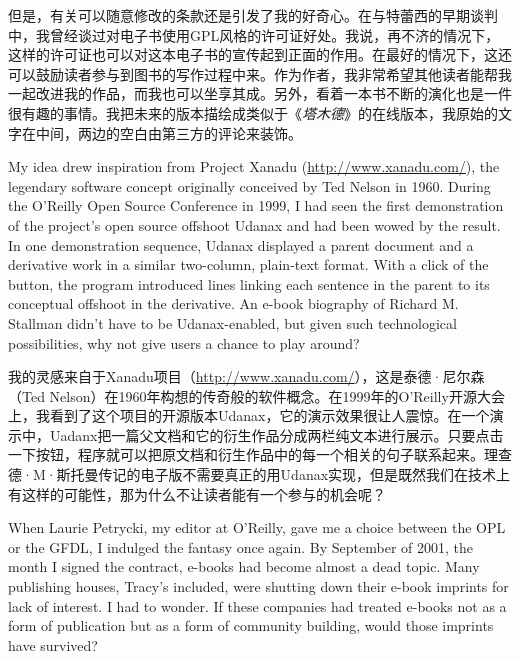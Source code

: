 \ifdefined\chs
但是，有关可以随意修改的条款还是引发了我的好奇心。在与特蕾西的早期谈判中，我曾经谈过对电子书使用GPL风格的许可证好处。我说，再不济的情况下，这样的许可证也可以对这本电子书的宣传起到正面的作用。在最好的情况下，这还可以鼓励读者参与到图书的写作过程中来。作为作者，我非常希望其他读者能帮我一起改进我的作品，而我也可以坐享其成。另外，看着一本书不断的演化也是一件很有趣的事情。我把未来的版本描绘成类似于《\textit{塔木德}》的在线版本，我原始的文字在中间，两边的空白由第三方的评论来装饰。
\fi

\ifdefined\eng
My idea drew inspiration from Project Xanadu (\url{http://www.xanadu.com/}), the legendary software concept originally conceived by Ted Nelson in 1960. During the O'Reilly Open Source Conference in 1999, I had seen the first demonstration of the project's open source offshoot Udanax and had been wowed by the result. In one demonstration sequence, Udanax displayed a parent document and a derivative work in a similar two-column, plain-text format. With a click of the button, the program introduced lines linking each sentence in the parent to its conceptual offshoot in the derivative. An e-book biography of Richard M. Stallman didn't have to be Udanax-enabled, but given such technological possibilities, why not give users a chance to play around?
\fi

\ifdefined\chs
我的灵感来自于Xanadu项目（\url{http://www.xanadu.com/}），这是泰德·尼尔森（Ted Nelson）在1960年构想的传奇般的软件概念。在1999年的O'Reilly开源大会上，我看到了这个项目的开源版本Udanax，它的演示效果很让人震惊。在一个演示中，Uadanx把一篇父文档和它的衍生作品分成两栏纯文本进行展示。只要点击一下按钮，程序就可以把原文档和衍生作品中的每一个相关的句子联系起来。理查德·M·斯托曼传记的电子版不需要真正的用Udanax实现，但是既然我们在技术上有这样的可能性，那为什么不让读者能有一个参与的机会呢？
\fi

\ifdefined\eng
When Laurie Petrycki, my editor at O'Reilly, gave me a choice between the OPL or the GFDL, I indulged the fantasy once again. By September of 2001, the month I signed the contract, e-books had become almost a dead topic. Many publishing houses, Tracy's included, were shutting down their e-book imprints for lack of interest. I had to wonder. If these companies had treated e-books not as a form of publication but as a form of community building, would those imprints have survived?
\fi

